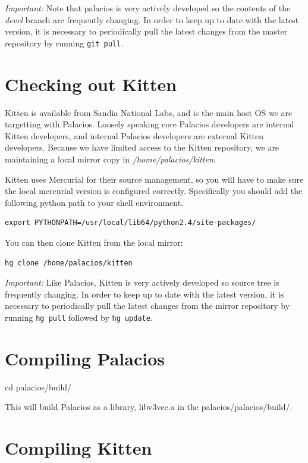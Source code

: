 \documentclass[11pt]{article}
\begin{document}
{\em Important:}
Note that palacios is very actively developed so the contents of the
{\em devel} branch are frequently changing. In order to keep up to
date with the latest version, it is necessary to periodically pull the
latest changes from the master repository by running \verb.git pull..



\section{Checking out Kitten}

Kitten is available from Sandia National Labs, and is the main host OS
we are targetting with Palacios. Loosely speaking core Palacios
developers are internal Kitten developers, and internal Palacios
developers are external Kitten developers. Because we have limited
access to the Kitten repository, we are maintaining a local mirror
copy in {\em /home/palacios/kitten}. 

Kitten uses Mercurial for their source management, so you will have to
make sure the local mercurial version is configured correctly.
Specifically you should add the following python path to your shell environment.

\begin{verbatim}
export PYTHONPATH=/usr/local/lib64/python2.4/site-packages/
\end{verbatim}

You can then clone Kitten from the local mirror:
\begin{verbatim}
hg clone /home/palacios/kitten
\end{verbatim}


{\em Important:} Like Palacios, Kitten is very actively developed so
source tree is frequently changing. In order to keep up to date with
the latest version, it is necessary to periodically pull the latest
changes from the mirror repository by running \verb.hg pull. followed
by \verb.hg update..

\section{Compiling Palacios}
cd palacios/build/

This will build Palacios as a library, libv3vee.a in the palacios/palacios/build/.


\section{Compiling Kitten}
\end{document}
